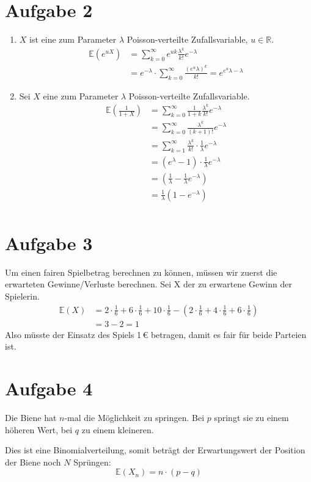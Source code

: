 \documentclass[10pt,a4paper,parskip=half]{scrartcl}
\newcommand{\E}{\mathbb{E}}
\newcommand{\R}{\mathbb{R}}
\begin{document}
\section*{Aufgabe 2}
\begin{enumerate}
\item $X$ ist eine zum Parameter $\lambda$ Poisson-verteilte Zufallsvariable, $u \in \R$.
\begin{align*}
\E(e^{uX}) &= \sum^{\infty}_{k=0} e^{uk}\frac{\lambda^k}{k!} e^{-\lambda} \\
&= e^{-\lambda}\cdot \sum_{k=0}^{\infty} \frac{(e^u\lambda)^k}{k!} = e^{e^u\lambda - \lambda}
\end{align*}
\item Sei $X$ eine zum Parameter $\lambda$ Poisson-verteilte Zufallsvariable.
\begin{align*}
\E\left(\frac{1}{1+X}\right) &= \sum^{\infty}_{k=0} \frac{1}{1+k}\frac{\lambda^k}{k!} e^{-\lambda} \\
&= \sum^{\infty}_{k=0} \frac{\lambda^k}{(k+1)!} e^{-\lambda} \\
&= \sum^{\infty}_{k=1} \frac{\lambda^{k}}{k!}\cdot \frac1\lambda e^{-\lambda} \\
&= (e^\lambda - 1) \cdot \frac1\lambda e^{-\lambda} \\
&= (\frac1\lambda  - \frac1\lambda e^{-\lambda}) \\
&= \frac{1}{\lambda}(1 - e^{-\lambda}) \\
\end{align*}
\end{enumerate}
\section*{Aufgabe 3}
Um einen fairen Spielbetrag berechnen zu können, müssen wir zuerst die erwarteten Gewinne/Verluste berechnen. Sei X der zu erwartene Gewinn der Spielerin.
\begin{align*}
\E(X) &= 2 \cdot \frac{1}{6} + 6 \cdot \frac{1}{6} + 10 \cdot \frac{1}{6}  - \left(2 \cdot \frac{1}{6} + 4 \cdot \frac{1}{6} + 6 \cdot\frac{1}{6}\right) \\
&= 3 - 2 = 1
\end{align*}
Also müsste der Einsatz des Spiels 1\,\euro{} betragen, damit es fair für beide Parteien ist.
\section*{Aufgabe 4}
%
%
Die Biene hat $n$-mal die Möglichkeit zu springen. Bei $p$ springt sie zu einem höheren Wert, bei $q$ zu einem kleineren.

Dies ist eine Binomialverteilung, somit beträgt der Erwartungswert der Position der Biene noch $N$ Sprüngen:
$$\E(X_n) = n \cdot \left(p - q\right)$$
\end{document}
